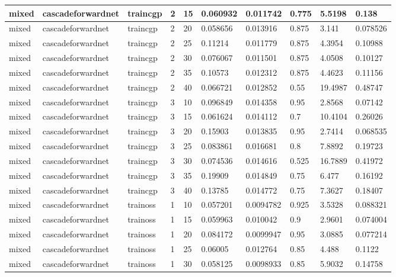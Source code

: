\begin{longtable}{lllllllll}
mixed & cascadeforwardnet & traincgp & 2 & 15 & 0.060932 & 0.011742 & 0.775 & 5.5198 & 0.138 \\ \hline 
mixed & cascadeforwardnet & traincgp & 2 & 20 & 0.058656 & 0.013916 & 0.875 & 3.141 & 0.078526 \\ \hline 
mixed & cascadeforwardnet & traincgp & 2 & 25 & 0.11214 & 0.011779 & 0.875 & 4.3954 & 0.10988 \\ \hline 
mixed & cascadeforwardnet & traincgp & 2 & 30 & 0.076067 & 0.011501 & 0.875 & 4.0508 & 0.10127 \\ \hline 
mixed & cascadeforwardnet & traincgp & 2 & 35 & 0.10573 & 0.012312 & 0.875 & 4.4623 & 0.11156 \\ \hline 
mixed & cascadeforwardnet & traincgp & 2 & 40 & 0.066721 & 0.012852 & 0.55 & 19.4987 & 0.48747 \\ \hline 
mixed & cascadeforwardnet & traincgp & 3 & 10 & 0.096849 & 0.014358 & 0.95 & 2.8568 & 0.07142 \\ \hline 
mixed & cascadeforwardnet & traincgp & 3 & 15 & 0.061624 & 0.014112 & 0.7 & 10.4104 & 0.26026 \\ \hline 
mixed & cascadeforwardnet & traincgp & 3 & 20 & 0.15903 & 0.013835 & 0.95 & 2.7414 & 0.068535 \\ \hline 
mixed & cascadeforwardnet & traincgp & 3 & 25 & 0.083861 & 0.016681 & 0.8 & 7.8892 & 0.19723 \\ \hline 
mixed & cascadeforwardnet & traincgp & 3 & 30 & 0.074536 & 0.014616 & 0.525 & 16.7889 & 0.41972 \\ \hline 
mixed & cascadeforwardnet & traincgp & 3 & 35 & 0.19909 & 0.014849 & 0.75 & 6.477 & 0.16192 \\ \hline 
mixed & cascadeforwardnet & traincgp & 3 & 40 & 0.13785 & 0.014772 & 0.75 & 7.3627 & 0.18407 \\ \hline 
mixed & cascadeforwardnet & trainoss & 1 & 10 & 0.057201 & 0.0094782 & 0.925 & 3.5328 & 0.088321 \\ \hline 
mixed & cascadeforwardnet & trainoss & 1 & 15 & 0.059963 & 0.010042 & 0.9 & 2.9601 & 0.074004 \\ \hline 
mixed & cascadeforwardnet & trainoss & 1 & 20 & 0.084172 & 0.0099947 & 0.95 & 3.0885 & 0.077214 \\ \hline 
mixed & cascadeforwardnet & trainoss & 1 & 25 & 0.06005 & 0.012764 & 0.85 & 4.488 & 0.1122 \\ \hline 
mixed & cascadeforwardnet & trainoss & 1 & 30 & 0.058125 & 0.0098933 & 0.85 & 5.9032 & 0.14758 \\ \hline 

\end{longtable}
